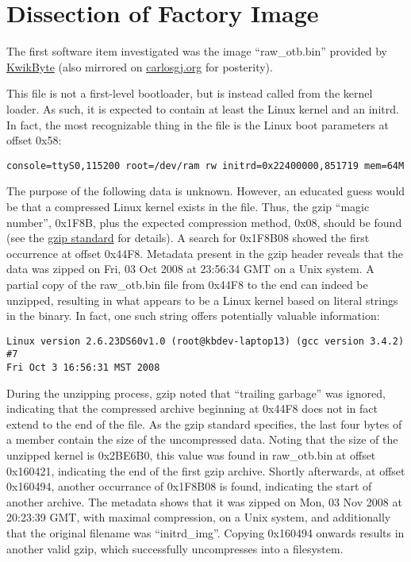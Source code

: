 \documentclass[]{article}
\begin{document}
\section{Dissection of Factory Image}
\par The first software item investigated was the image ``raw\_otb.bin'' provided by \href{http://www.kwikbyte.com/driverstation/binary/raw_otb.bin}{KwikByte} (also mirrored on \href{http://carlosgj.org/FRC/DS60/raw_otb.bin}{carlosgj.org} for posterity).
\par This file is not a first-level bootloader, but is instead called from the kernel loader. As such, it is expected to contain at least the Linux kernel and an initrd. In fact, the most recognizable thing in the file is the Linux boot parameters at offset 0x58:
\begin{verbatim}
console=ttyS0,115200 root=/dev/ram rw initrd=0x22400000,851719 mem=64M
\end{verbatim}
\par The purpose of the following data is unknown. However, an educated guess would be that a compressed Linux kernel exists in the file. Thus, the gzip ``magic number'', 0x1F8B, plus the expected compression method, 0x08, should be found (see the \href{https://tools.ietf.org/html/rfc1952}{gzip standard} for details). A search for 0x1F8B08 showed the first occurrence at offset 0x44F8. Metadata present in the gzip header reveals that the data was zipped on Fri, 03 Oct 2008 at 23:56:34 GMT on a Unix system. A partial copy of the raw\_otb.bin file from 0x44F8 to the end can indeed be unzipped, resulting in what appears to be a Linux kernel based on literal strings in the binary. In fact, one such string offers potentially valuable information:
\begin{verbatim}
Linux version 2.6.23DS60v1.0 (root@kbdev-laptop13) (gcc version 3.4.2) #7 
Fri Oct 3 16:56:31 MST 2008
\end{verbatim}
\par During the unzipping process, gzip noted that ``trailing garbage'' was ignored, indicating that the compressed archive beginning at 0x44F8 does not in fact extend to the end of the file. As the gzip standard specifies, the last four bytes of a member contain the size of the uncompressed data. Noting that the size of the unzipped kernel is 0x2BE6B0, this value was found in raw\_otb.bin at offset 0x160421, indicating the end of the first gzip archive. Shortly afterwards, at offset 0x160494, another occurrance of 0x1F8B08 is found, indicating the start of another archive. The metadata shows that it was zipped on Mon, 03 Nov 2008 at 20:23:39 GMT, with maximal compression, on a Unix system, and additionally that the original filename was ``initrd\_img''. Copying 0x160494 onwards results in another valid gzip, which successfully uncompresses into a filesystem.
\end{document}
